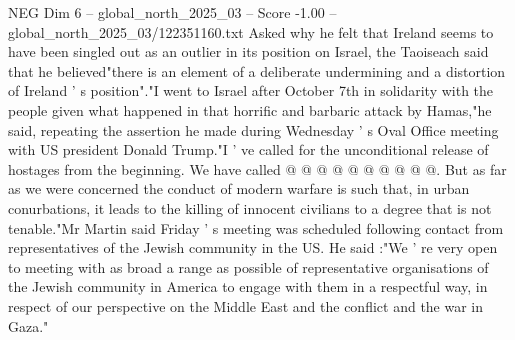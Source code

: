 \begin{textsample}{NEG Dim 6 – global\_north\_2025\_03 – Score -1.00 – global\_north\_2025\_03/122351160.txt}
Asked why he felt that Ireland seems to have been singled out as an outlier in its position on Israel, the Taoiseach said that he believed"there is an element of a deliberate undermining and a distortion of Ireland ' s position"."I went to Israel after October 7th in solidarity with the people given what happened in that horrific and barbaric attack by Hamas,"he said, repeating the assertion he made during Wednesday ' s Oval Office meeting with US president Donald Trump."I ' ve called for the unconditional release of hostages from the beginning.
We have called @ @ @ @ @ @ @ @ @ @.
But as far as we were concerned the conduct of modern warfare is such that, in urban conurbations, it leads to the killing of innocent civilians to a degree that is not tenable."Mr Martin said Friday ' s meeting was scheduled following contact from representatives of the Jewish community in the US.
He said :"We ' re very open to meeting with as broad a range as possible of representative organisations of the Jewish community in America to engage with them in a respectful way, in respect of our perspective on the Middle East and the conflict and the war in Gaza."

\end{textsample}
